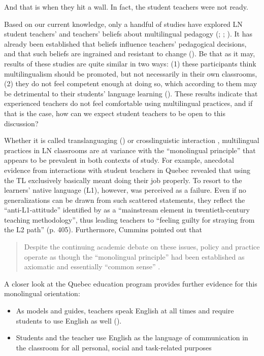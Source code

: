 \documentclass[output=paper]{../langscibook}
\begin{document}
And that is when they hit a wall. In fact, the student teachers were not ready.

Based on our current knowledge, only a handful of studies have explored LN student teachers’ and teachers’ beliefs about multilingual pedagogy (\citealt{ArocenaEgañaEtAl2015}; \citealt{CreeseBlackledge2010}; \citealt{DeAngelis2011,Haukås2016,Woll2020}). It has already been established that beliefs influence teachers’ pedagogical decisions, and that such beliefs are ingrained and resistant to change (\citealt{PhippsBorg2009}). Be that as it may, results of these studies are quite similar in two ways: (1) these participants think multilingualism should be promoted, but not necessarily in their own classrooms, (2) they do not feel competent enough at doing so, which according to them may be detrimental to their students’ language learning (\citealt{DeAngelis2011}). These results indicate that experienced teachers do not feel comfortable using multilingual practices, and if that is the case, how can we expect student teachers to be open to this discussion?

Whether it is called translanguaging (\citealt{GarciaLi2014}) or crosslinguistic interaction \citep{Jessner2008}, multilingual practices in LN classrooms are at variance with the “monolingual principle” \citep{Cummins2007} that appears to be prevalent in both contexts of study. For example, anecdotal evidence from interactions with student teachers in Quebec revealed that using the TL exclusively basically meant doing their job properly. To resort to the learners’ native language (L1), however, was perceived as a failure. Even if no generalizations can be drawn from such scattered statements, they reflect the “anti-L1-attitude” identified by \citet{Cook2001} as a “mainstream element in twentieth-century teaching methodology”, thus leading teachers to “feeling guilty for straying from the L2 path” (p. 405). Furthermore, Cummins pointed out that\largerpage

\begin{quote}
Despite the continuing academic debate on these issues, policy and practice operate as though the “monolingual principle” had been established as axiomatic and essentially “common sense” \citep[224]{Cummins2007}. 
\end{quote}

A closer look at the Quebec education program provides further evidence for this monolingual orientation:

\begin{itemize}
\item  As models and guides, teachers speak English at all times and require students to use English as well (\citealt[7]{MEQ2007}).
\item Students and the teacher use English as the language of communication in the classroom for all personal, social and task-related purposes \citep{MEQ2007}
\end{itemize}
\end{document}
